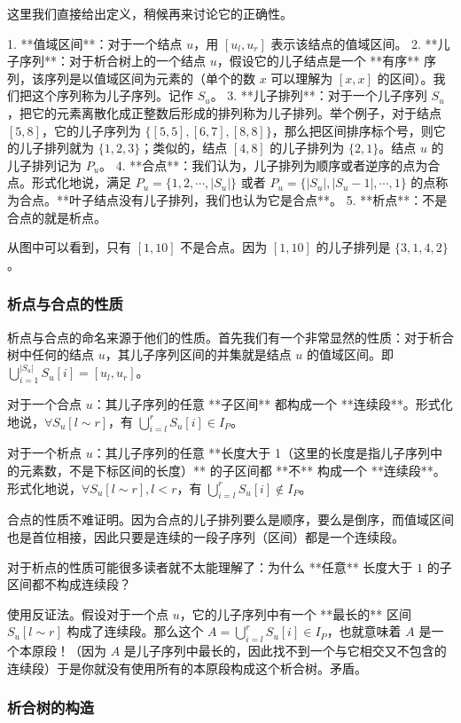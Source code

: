 \documentclass[12pt]{ctexart}
\begin{document}
这里我们直接给出定义，稍候再来讨论它的正确性。

1. **值域区间**：对于一个结点 $u$，用 $[u_l,u_r]$ 表示该结点的值域区间。
2. **儿子序列**：对于析合树上的一个结点 $u$，假设它的儿子结点是一个 **有序** 序列，该序列是以值域区间为元素的（单个的数 $x$ 可以理解为 $[x,x]$ 的区间）。我们把这个序列称为儿子序列。记作 $S_u$。
3. **儿子排列**：对于一个儿子序列 $S_u$，把它的元素离散化成正整数后形成的排列称为儿子排列。举个例子，对于结点 $[5,8]$，它的儿子序列为 $\{[5,5],[6,7],[8,8]\}$，那么把区间排序标个号，则它的儿子排列就为 $\{1,2,3\}$；类似的，结点 $[4,8]$ 的儿子排列为 $\{2,1\}$。结点 $u$ 的儿子排列记为 $P_u$。
4. **合点**：我们认为，儿子排列为顺序或者逆序的点为合点。形式化地说，满足 $P_u=\{1,2,\cdots,|S_u|\}$ 或者 $P_u=\{|S_u|,|S_u-1|,\cdots,1\}$ 的点称为合点。**叶子结点没有儿子排列，我们也认为它是合点**。
5. **析点**：不是合点的就是析点。

从图中可以看到，只有 $[1,10]$ 不是合点。因为 $[1,10]$ 的儿子排列是 $\{3,1,4,2\}$。

\subsubsection{析点与合点的性质}

析点与合点的命名来源于他们的性质。首先我们有一个非常显然的性质：对于析合树中任何的结点 $u$，其儿子序列区间的并集就是结点 $u$ 的值域区间。即 $\bigcup_{i=1}^{|S_u|}S_u[i]=[u_l,u_r]$。

对于一个合点 $u$：其儿子序列的任意 **子区间** 都构成一个 **连续段**。形式化地说，$\forall S_u[l\sim r]$，有 $\bigcup_{i=l}^rS_u[i]\in I_P$。

对于一个析点 $u$：其儿子序列的任意 **长度大于 1（这里的长度是指儿子序列中的元素数，不是下标区间的长度）** 的子区间都 **不** 构成一个 **连续段**。形式化地说，$\forall S_u[l\sim r],l<r$，有 $\bigcup_{i=l}^rS_u[i]\notin I_P$。

合点的性质不难证明。因为合点的儿子排列要么是顺序，要么是倒序，而值域区间也是首位相接，因此只要是连续的一段子序列（区间）都是一个连续段。

对于析点的性质可能很多读者就不太能理解了：为什么 **任意** 长度大于 $1$ 的子区间都不构成连续段？

使用反证法。假设对于一个点 $u$，它的儿子序列中有一个 **最长的** 区间 $S_u[l\sim r]$ 构成了连续段。那么这个 $A=\bigcup_{i=l}^rS_u[i]\in I_P$，也就意味着 $A$ 是一个本原段！（因为 $A$ 是儿子序列中最长的，因此找不到一个与它相交又不包含的连续段）于是你就没有使用所有的本原段构成这个析合树。矛盾。

\subsubsection{析合树的构造}
\end{document}
